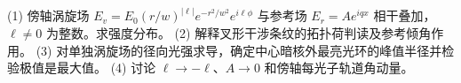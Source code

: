 (1) 傍轴涡旋场 \(E_v=E_0(r/w)^{|\ell|}e^{-r^2/w^2}e^{i\ell\phi}\) 与参考场 \(E_r=Ae^{iqx}\) 相干叠加，\(\ell\ne0\) 为整数。求强度分布。
(2) 解释叉形干涉条纹的拓扑荷判读及参考倾角作用。
(3) 对单独涡旋场的径向光强求导，确定中心暗核外最亮光环的峰值半径并检验极值是最大值。
(4) 讨论 \(\ell\to-\ell\)、\(A\to0\) 和傍轴每光子轨道角动量。
